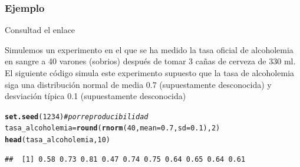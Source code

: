\documentclass[12pt,t]{beamer}\usepackage[]{graphicx}\usepackage[]{color}
\makeatletter
\newcommand{\hlnum}[1]{\textcolor[rgb]{0.686,0.059,0.569}{#1}}%
\newcommand{\hlcom}[1]{\textcolor[rgb]{0.678,0.584,0.686}{\textit{#1}}}%
\newcommand{\hlstd}[1]{\textcolor[rgb]{0.345,0.345,0.345}{#1}}%
\newcommand{\hlkwb}[1]{\textcolor[rgb]{0.69,0.353,0.396}{#1}}%
\newcommand{\hlkwc}[1]{\textcolor[rgb]{0.333,0.667,0.333}{#1}}%
\newcommand{\hlkwd}[1]{\textcolor[rgb]{0.737,0.353,0.396}{\textbf{#1}}}%
\newenvironment{kframe}{%
 \def\at@end@of@kframe{}%
 \ifinner\ifhmode%
  \def\at@end@of@kframe{\end{minipage}}%
  \begin{minipage}{\columnwidth}%
 \fi\fi%
 \def\FrameCommand##1{\hskip\@totalleftmargin \hskip-\fboxsep
 \colorbox{shadecolor}{##1}\hskip-\fboxsep
     \hskip-\linewidth \hskip-\@totalleftmargin \hskip\columnwidth}%
 \MakeFramed {\advance\hsize-\width
   \@totalleftmargin\z@ \linewidth\hsize
   \@setminipage}}%
 {\par\unskip\endMakeFramed%
 \at@end@of@kframe}
\newenvironment{knitrout}{}{} %
\newcommand{\MYhref}[3][blue]{\href{#2}{\color{#1}{#3}}}%
\theoremstyle{plain}
\theoremstyle{definition}
\makeatother
\begin{document}
%
%
%
%
%


\begin{frame}[fragile]
\frametitle{Ejemplo}
\vspace*{-2ex}
Consultad el enlace \MYhref[green]{https://twitter.com/guardiacivil/status/805154653977608192/photo/1}{Guardia civil informa...}

Simulemos un experimento en el que se ha medido la tasa oficial  de  alcoholemia en sangre a 40 varones (sobrios) después de tomar 3 cañas de cerveza de 330 ml.
El siguiente código simula este experimento supuesto que la tasa de alcoholemia siga una distribución normal de media 0.7 (supuestamente desconocida) y desviación típica 0.1 (supuestamente desconocida)



\begin{knitrout}\scriptsize
{}\color{fgcolor}\begin{kframe}
\begin{alltt}
\hlkwd{set.seed}\hlstd{(}\hlnum{1234}\hlstd{)}\hlcom{# por reproducibilidad}
\hlstd{tasa_alcoholemia}\hlkwb{=}\hlkwd{round}\hlstd{(}\hlkwd{rnorm}\hlstd{(}\hlnum{40}\hlstd{,}\hlkwc{mean}\hlstd{=}\hlnum{0.7}\hlstd{,}\hlkwc{sd}\hlstd{=}\hlnum{0.1}\hlstd{),}\hlnum{2}\hlstd{)}
\hlkwd{head}\hlstd{(tasa_alcoholemia,}\hlnum{10}\hlstd{)}
\end{alltt}
\begin{verbatim}
##  [1] 0.58 0.73 0.81 0.47 0.74 0.75 0.64 0.65 0.64 0.61
\end{verbatim}
\end{kframe}
\end{knitrout}
\end{frame}
\end{document}
